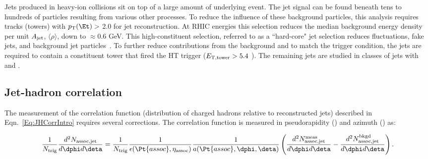 Jets produced in heavy-ion collisions sit on top of a large amount of underlying event.  The jet signal can be found beneath tens to hundreds of particles resulting from various other processes. To reduce the influence of these background particles, this analysis requires tracks (towers) with $\ensuremath{p_{\rm T}}\xspace (\Et) >$ 2.0 \GeVc for jet reconstruction.  At RHIC energies this selection reduces the median background energy density per unit $A_{\rm jet}$, $\langle \rho \rangle$, down to $\approx 0.6$ GeV.  This high-constituent selection, referred to as a ``hard-core" jet selection reduces fluctuations, fake jets, and background jet particles~\cite{PhysRevLett.119.062301}.  To further reduce contributions from the background and to match the trigger condition, the jets are required to contain a constituent tower that fired the HT trigger ($ E_{\rm T, tower}> 5.4$ \GeVc). The remaining jets are studied in classes of jets with  and . 

\subsection{Jet-hadron correlation} \label{sect:Correlations}
The measurement of the correlation function (distribution of charged hadrons relative to reconstructed jets) described in Eqn.~\ref{Eq:JHCorrIntro} requires several corrections.  The correlation function is measured in pseudorapidity (\deta) and azimuth (\dphi) as: 

\begin{equation}
	\frac{1}{N_{\rm trig}} \frac{d^2N_{\rm assoc,jet}}{d\dphi d\deta} = \frac{1}{N_{\rm trig}} \frac{1}{\epsilon(\Pt{assoc}, \eta_{\rm assoc})} \frac{1}{a(\Pt{assoc}, \text{\dphi}, \text{\deta})}\left(\frac{d^2 N^{\rm meas}_{\rm assoc,jet}}{d\dphi d\deta} - \frac{d^2 N^{\rm bkgd}_{\rm assoc,jet}}{d\dphi d\deta}\right) .
	\label{Eqtn:CorrFunction}
\end{equation}


